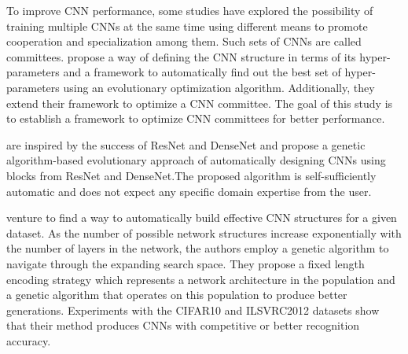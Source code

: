 \documentclass[a4paper,fleqn]{cas-sc}
\begin{document}
To improve CNN performance, some studies have explored the possibility of training multiple CNNs at the same time using different means to promote cooperation and specialization among them. Such sets of CNNs are called committees. \citet{Bochinski2017} propose a way of defining the CNN structure in terms of its hyper-parameters and a framework to automatically find out the best set of hyper-parameters using an evolutionary optimization algorithm. Additionally, they extend their framework to optimize a CNN committee. The goal of this study is to establish a framework to optimize CNN committees for better performance.%

\citet{YananBing2019} are inspired by the success of ResNet and DenseNet and propose a genetic algorithm-based evolutionary approach of automatically designing CNNs using blocks from ResNet and DenseNet.The proposed algorithm is self-sufficiently automatic and does not expect any specific domain expertise from the user. %

\citet{XieYuille2017} venture to find a way to  automatically build effective CNN structures for a given dataset. As the number of possible network structures increase exponentially with the number of layers in the network, the authors employ a genetic algorithm to navigate through the expanding search space. They propose a fixed length encoding strategy which represents a network architecture in the population and a genetic algorithm that operates on this population to produce better generations. Experiments with the CIFAR10 and ILSVRC2012 datasets show that their method produces CNNs with competitive or better recognition accuracy. %
\end{document}
